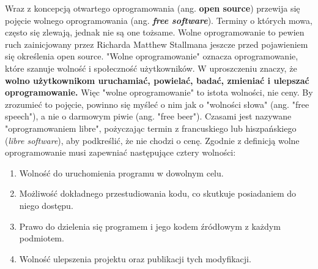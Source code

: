 \documentclass{article}
\begin{document}
\hspace{4mm} Wraz z koncepcją otwartego oprogramowania (ang. \textbf{open source}) przewija się pojęcie wolnego oprogramowania (ang. \textbf{\emph{free software}}). Terminy o których mowa, często się zlewają, jednak nie są one tożsame. Wolne oprogramowanie to pewien ruch zainicjowany przez Richarda Matthew Stallmana jeszcze przed pojawieniem się określenia open source. "Wolne oprogramowanie" oznacza oprogramowanie, które szanuje wolność i społeczność użytkowników. W uproszczeniu znaczy, że \textbf{wolno użytkownikom uruchamiać, powielać, badać, zmieniać i ulepszać oprogramowanie.} Więc "wolne oprogramowanie" to istota wolności, nie ceny. By zrozumieć to pojęcie, powinno się myśleć o nim jak o "wolności słowa" (ang. "free speech"), a nie o darmowym piwie (ang. "free beer"). Czasami jest nazywane "oprogramowaniem libre", pożyczając termin z francuskiego lub hiszpańskiego (\emph{libre software}), aby podkreślić, że nie chodzi o cenę\cite{gnu.free}. Zgodnie z definicją wolne oprogramowanie musi zapewniać następujące cztery wolności\cite{Webbink}:

\begin{enumerate}
    \item Wolność do uruchomienia programu w dowolnym celu.
    \item Możliwość dokładnego przestudiowania kodu, co skutkuje posiadaniem do niego dostępu.
    \item Prawo do dzielenia się programem i jego kodem źródłowym z każdym podmiotem.
    \item Wolność ulepszenia projektu oraz publikacji tych modyfikacji. 
\end{enumerate}
\end{document}
